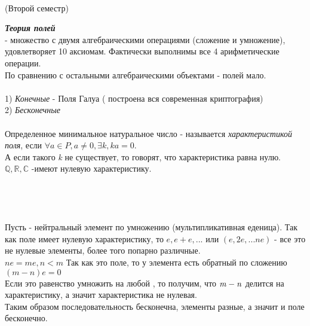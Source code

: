 
\begin{center}
 \\
\LARGE{(Второй семестр)} \\

\end{center}

{{\large\bfseries\emph {{Теория полей}}}} \\

 - множество с двумя алгебраическими операциями (сложение и умножение), удовлетворяет 10 аксиомам. Фактически выполнимы все 4 арифметические операции. \\

По сравнению с остальными алгебраическими объектами - полей мало. \\

\\
1) {\emph {Конечные}} - Поля Галуа ( построена вся современная криптография)\\
2) {\emph {Бесконечные}} \\

\\
Определенное минимальное натуральное число  - называется {\emph  {характеристикой поля}}, если $\forall \mathit{a} \in \mathit {P,a} \neq 0, \exists \mathit {k}, \mathit{ka} = 0 $. \\
А если такого {\emph {k}} не существует, то говорят, что характеристика равна нулю.\\

$\mathbb{Q, R, C}$ -имеют нулевую характеристику.\\

 \\

\\
 \\

 \\
Пусть  - нейтральный элемент по умножению (мультипликативная еденица). Так как поле имеет нулевую характеристику, то $\mathit {e, e+e, ...}$ или $\mathit {(e, 2e, ... ne)}$ - все это не нулевые элементы, более того попарно различные. \\
$\mathit {ne = me, n < m}$ Так как это поле, то у элемента  есть обратный по сложению $\mathit {(m-n)e=0}$ \\
Если это равенство умножить на любой , то получим, что $\mathit {m-n}$ делится на характеристику, а значит характеристика не нулевая.\\
Таким образом последовательность бесконечна, элементы разные, а значит и поле бесконечно.\\


